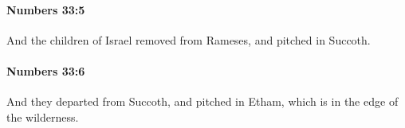 		\paragraph{Numbers 33:5} %
			\label{NUMBERS-33-5}

			And the children of Israel removed from Rameses, and pitched in Succoth.


		\paragraph{Numbers 33:6} %
			\label{NUMBERS-33-6}

			And they departed from Succoth, and pitched in Etham, which is in the edge of the wilderness.


